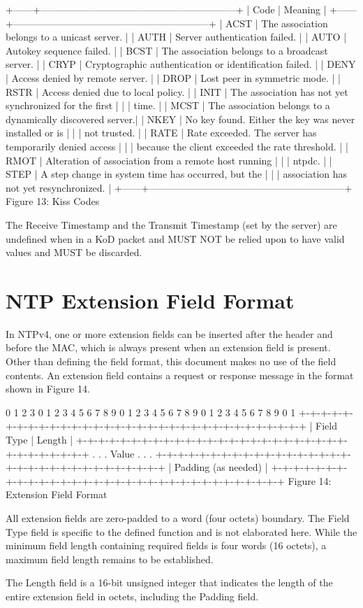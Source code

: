 +------+------------------------------------------------------------+
| Code | Meaning |
+------+------------------------------------------------------------+
| ACST | The association belongs to a unicast server. |
| AUTH | Server authentication failed. |
| AUTO | Autokey sequence failed. |
| BCST | The association belongs to a broadcast server. |
| CRYP | Cryptographic authentication or identification failed. |
| DENY | Access denied by remote server. |
| DROP | Lost peer in symmetric mode. |
| RSTR | Access denied due to local policy. |
| INIT | The association has not yet synchronized for the first |
| | time. |
| MCST | The association belongs to a dynamically discovered server.|
| NKEY | No key found. Either the key was never installed or is |
| | not trusted. |
| RATE | Rate exceeded. The server has temporarily denied access |
| | because the client exceeded the rate threshold. |
| RMOT | Alteration of association from a remote host running |
| | ntpdc. |
| STEP | A step change in system time has occurred, but the |
| | association has not yet resynchronized. |
+------+------------------------------------------------------------+
Figure 13: Kiss Codes

The Receive Timestamp and the Transmit Timestamp (set by the server)
are undefined when in a KoD packet and MUST NOT be relied upon to
have valid values and MUST be discarded.

\section{NTP Extension Field Format}

In NTPv4, one or more extension fields can be inserted after the
header and before the MAC, which is always present when an extension
field is present. Other than defining the field format, this
document makes no use of the field contents. An extension field
contains a request or response message in the format shown in
Figure 14.

0 1 2 3
0 1 2 3 4 5 6 7 8 9 0 1 2 3 4 5 6 7 8 9 0 1 2 3 4 5 6 7 8 9 0 1
+-+-+-+-+-+-+-+-+-+-+-+-+-+-+-+-+-+-+-+-+-+-+-+-+-+-+-+-+-+-+-+-+
| Field Type | Length |
+-+-+-+-+-+-+-+-+-+-+-+-+-+-+-+-+-+-+-+-+-+-+-+-+-+-+-+-+-+-+-+-+
. .
. Value .
. .
+-+-+-+-+-+-+-+-+-+-+-+-+-+-+-+-+-+-+-+-+-+-+-+-+-+-+-+-+-+-+-+-+
| Padding (as needed) |
+-+-+-+-+-+-+-+-+-+-+-+-+-+-+-+-+-+-+-+-+-+-+-+-+-+-+-+-+-+-+-+-+
Figure 14: Extension Field Format

All extension fields are zero-padded to a word (four octets)
boundary. The Field Type field is specific to the defined function
and is not elaborated here. While the minimum field length
containing required fields is four words (16 octets), a maximum field
length remains to be established.

The Length field is a 16-bit unsigned integer that indicates the
length of the entire extension field in octets, including the Padding
field.
